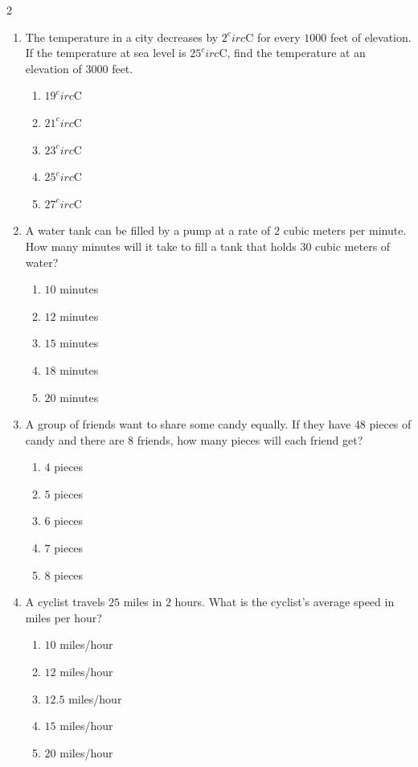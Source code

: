 \documentclass[10pt]{article}
\begin{document}
\begin{multicols}{2}
\begin{enumerate}[label=\textbf{Q\arabic*.}, leftmargin=*, itemsep=6pt, parsep=0pt]
  \item \small The temperature in a city decreases by $2^circ$C for every $1000$ feet of elevation. If the temperature at sea level is $25^circ$C, find the temperature at an elevation of $3000$ feet.
  \begin{enumerate}[label=(\Alph*), leftmargin=0.6cm, nosep, itemsep=2pt]
    \item $19^circ$C
    \item $21^circ$C
    \item $23^circ$C
    \item $25^circ$C
    \item $27^circ$C
  \end{enumerate}

  \item \small A water tank can be filled by a pump at a rate of $2$ cubic meters per minute. How many minutes will it take to fill a tank that holds $30$ cubic meters of water?
  \begin{enumerate}[label=(\Alph*), leftmargin=0.6cm, nosep, itemsep=2pt]
    \item $10$ minutes
    \item $12$ minutes
    \item $15$ minutes
    \item $18$ minutes
    \item $20$ minutes
  \end{enumerate}

  \item \small A group of friends want to share some candy equally. If they have $48$ pieces of candy and there are $8$ friends, how many pieces will each friend get?
  \begin{enumerate}[label=(\Alph*), leftmargin=0.6cm, nosep, itemsep=2pt]
    \item $4$ pieces
    \item $5$ pieces
    \item $6$ pieces
    \item $7$ pieces
    \item $8$ pieces
  \end{enumerate}

  \item \small A cyclist travels $25$ miles in $2$ hours. What is the cyclist's average speed in miles per hour?
  \begin{enumerate}[label=(\Alph*), leftmargin=0.6cm, nosep, itemsep=2pt]
    \item $10$ miles/hour
    \item $12$ miles/hour
    \item $12.5$ miles/hour
    \item $15$ miles/hour
    \item $20$ miles/hour
  \end{enumerate}


\end{enumerate}
\end{multicols}
\end{document}
